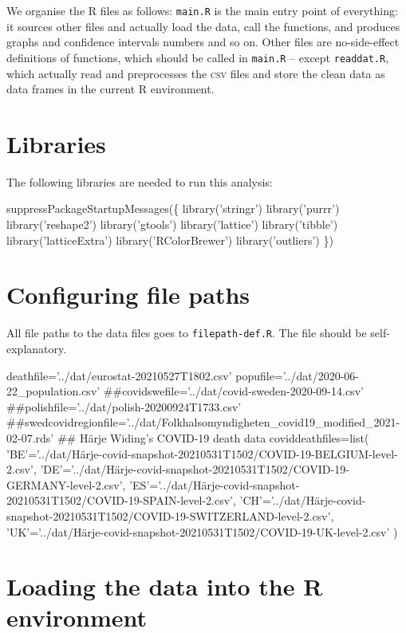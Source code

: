 \documentclass{article}
\begin{document}
We organise the R files as follows: {\tt{}main.R} is the main entry point of everything: it sources other files
and actually load the data, call the functions, and produces graphs and confidence intervals numbers and so on.
Other files are no-side-effect definitions of functions, which should be called in {\tt{}main.R} -- except {\tt{}readdat.R},
which actually read and preprocesses the \textsc{csv} files and store the clean data as data frames in the current R
environment.

\section{Libraries}

The following libraries are needed to run this analysis:

\endmoddef
suppressPackageStartupMessages(\{
  library('stringr')
  library('purrr')
  library('reshape2')
  library('gtools')
  library('lattice')
  library('tibble')
  library('latticeExtra')
  library('RColorBrewer')
  library('outliers')
\})
\nwendcode{}\nwdocspar

\section{Configuring file paths}
All file paths to the data files goes to {\tt{}filepath-def.R}. The file should be self-explanatory.

\nwenddocs{}\endmoddef
deathfile='../dat/eurostat-20210527T1802.csv'
popufile='../dat/2020-06-22_population.csv'
##covidswefile='../dat/covid-sweden-2020-09-14.csv'
##polishfile='../dat/polish-20200924T1733.csv'
##swedcovidregionfile='../dat/Folkhalsomyndigheten_covid19_modified_2021-02-07.rds'
## Härje Widing's COVID-19 death data
coviddeathfiles=list(
  'BE'='../dat/Härje-covid-snapshot-20210531T1502/COVID-19-BELGIUM-level-2.csv',
  'DE'='../dat/Härje-covid-snapshot-20210531T1502/COVID-19-GERMANY-level-2.csv',
  'ES'='../dat/Härje-covid-snapshot-20210531T1502/COVID-19-SPAIN-level-2.csv',
  'CH'='../dat/Härje-covid-snapshot-20210531T1502/COVID-19-SWITZERLAND-level-2.csv',
  'UK'='../dat/Härje-covid-snapshot-20210531T1502/COVID-19-UK-level-2.csv'
)
\nwendcode{}\nwdocspar

\section{Loading the data into the R environment}
\end{document}
